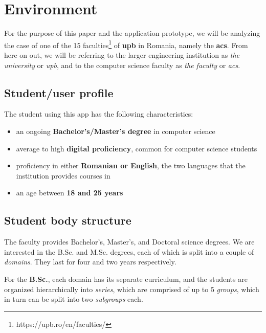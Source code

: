 \section{Environment} \label{1:environment}

    For the purpose of this paper and the application prototype, we will be analyzing the case of one of the 15 faculties\footnote{https://upb.ro/en/faculties/} of \textbf{\acrlong{upb}} in Romania, namely the \textbf{\acrlong{acs}}. From here on out, we will be referring to the larger engineering institution as \textit{the university} or \textit{\acrshort{upb}}, and to the computer science faculty as \textit{the faculty} or \textit{\acrshort{acs}}.
    
    \subsection{Student/user profile} \label{2:student_profile}
    
        The student using this app has the following characteristics:
        \begin{itemize}
            \item an ongoing \textbf{Bachelor's/Master's degree} in computer science
            \item average to high \textbf{digital proficiency}, common for computer science students%
            \item proficiency in either \textbf{Romanian or English}, the two languages that the institution provides courses in%
            \item an age between \textbf{18 and 25 years}
        \end{itemize}
        
    \subsection{Student body structure} \label{1:student_body_structure}
    
        The faculty provides Bachelor's, Master's, and Doctoral science degrees. We are interested in the B.Sc. and M.Sc. degrees, each of which is split into a couple of \textit{domains}. They last for four and two years respectively.
        
        For the \textbf{B.Sc.}, each domain has its separate curriculum, and the students are organized hierarchically into \textit{series}, which are comprised of up to 5 \textit{groups}, which in turn can be split into two \textit{subgroups} each.
        
